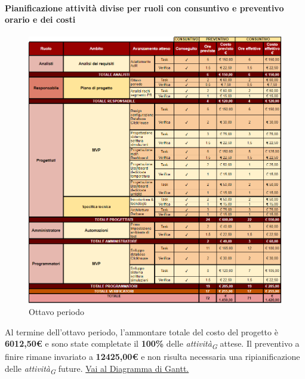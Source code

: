 \paragraph{Pianificazione attività divise per ruoli con consuntivo e preventivo orario e dei costi}

\vspace{0.4cm}

\begin{figure}[H]
    \centering
    \includegraphics[height=1.1\textwidth]{../Images/periodo8.PNG}
    \caption{Ottavo periodo}
    \label{fig:Ottavo_periodo}
\end{figure}

Al termine dell'ottavo periodo, l'ammontare totale del costo del progetto è \textbf{6012,50\euro} e sono state completate il \textbf{100\%} delle \textit{attività}\textsubscript{\textit{G}} attese.
Il preventivo a finire rimane invariato a \textbf{12425,00\euro} e non risulta necessaria una ripianificazione delle \textit{attività}\textsubscript{\textit{G}} future.
\href{https://github.com/orgs/ByteOps-swe/projects/3/views/1?sortedBy%5Bdirection%5D=asc&sortedBy%5BcolumnId%5D=64182560}{Vai al Diagramma di Gantt.}

